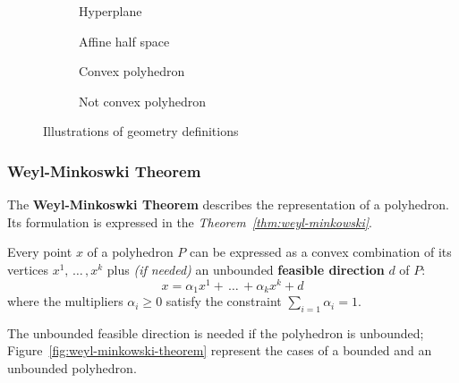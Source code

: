 \documentclass[english]{article}
\begin{document}
\begin{figure}[htbp]
  \bigskip
  \centering
  \begin{subfigure}[b]{0.495\textwidth}
    \centering
    \bigskip
    \caption{Hyperplane}
    \label{subfig:hyperplane}
    \bigskip
  \end{subfigure}
  \bigskip
  \begin{subfigure}[b]{0.495\textwidth}
    \centering
    \bigskip
    \caption{Affine half space}
    \label{subfig:affine-half-space}
    \bigskip
  \end{subfigure}
  \begin{subfigure}[h]{0.495\textwidth}
    \centering
    \bigskip
    \caption{Convex polyhedron}
    \label{subfig:convex-hull}
    \bigskip
  \end{subfigure}
  \begin{subfigure}[h]{0.495\textwidth}
    \centering
    \bigskip
    \caption{Not convex polyhedron}
    \label{subfig:not-convex-hull}
    \bigskip
  \end{subfigure}
  \caption{Illustrations of \LP geometry definitions}
  \label{fig:lp-geometry}
  \bigskip
\end{figure}

\subsubsection{Weyl-Minkoswki Theorem}

The \textbf{Weyl-Minkoswki Theorem} describes the representation of a polyhedron.
Its formulation is expressed in the \textit{Theorem~\ref{thm:weyl-minkowski}}.

\begin{theorem}
  Every point \(x\) of a polyhedron \(P\) can be expressed as a convex combination of its vertices \(x^1, \, \ldots \,, x^k\) plus \textit{(if needed)} an unbounded \textbf{feasible direction} \(d\) of \(P\):
  \[ x = \alpha_1 x^1 + \, \ldots \, + \alpha_k x^k + d \]
  where the multipliers \(\alpha_i \geq 0\) satisfy the constraint \(\displaystyle\sum_{i=1} \alpha_i = 1\).
  \label{thm:weyl-minkowski}
\end{theorem}

\bigskip
The unbounded feasible direction is needed if the polyhedron is unbounded; Figure~\ref{fig:weyl-minkowski-theorem} represent the cases of a bounded and an unbounded polyhedron.
\end{document}

